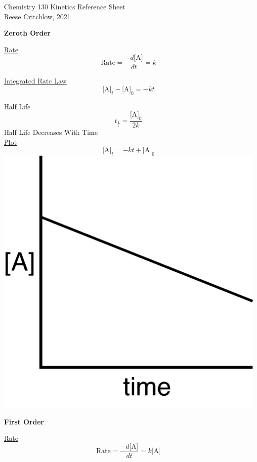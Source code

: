 \documentclass{article}
\begin{document}
\begin{center}
\large
Chemistry 130 Kinetics Reference Sheet\\
\normalsize
Reese Critchlow, 2021
\begin{multicols}{3}

    \large
    \textbf{Zeroth Order}
    \normalsize
    \medskip
    
    \underline{Rate}
    \[
        \textrm{Rate} = \frac{-d\textrm{[A]}}{dt} = k
    \]
    
    \underline{Integrated Rate Law}
    \[
        \textrm{[A]}_t  - \textrm{[A]}_0 = -kt
    \]

    \underline{Half Life}
    \[
        t_{\frac{1}{2}} = \frac{\textrm{[A]}_0}{2k}
    \]
    \footnotesize
    Half Life Decreases With Time
    \normalsize\\
    \medskip
    \underline{Plot}
    \[
        \textrm{[A]}_t = -kt + \textrm{[A]}_0
    \]
    \includegraphics[scale =0.25]{zerothorder.png}
    
    


\vfill\null\columnbreak

    \large
    \textbf{First Order}
    \normalsize
    \medskip
    
    \underline{Rate}
    \[
        \textrm{Rate} = \frac{-d\textrm{[A]}}{dt} = k\textrm{[A]}
    \]
    

\end{multicols}
\end{center}
\end{document}
